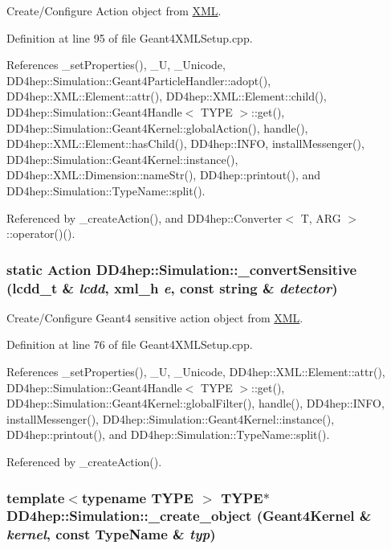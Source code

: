 Create/Configure Action object from \hyperlink{namespace_d_d4hep_1_1_x_m_l}{XML}. 

Definition at line 95 of file Geant4XMLSetup.cpp.

References \_\-setProperties(), \_\-U, \_\-Unicode, DD4hep::Simulation::Geant4ParticleHandler::adopt(), DD4hep::XML::Element::attr(), DD4hep::XML::Element::child(), DD4hep::Simulation::Geant4Handle$<$ TYPE $>$::get(), DD4hep::Simulation::Geant4Kernel::globalAction(), handle(), DD4hep::XML::Element::hasChild(), DD4hep::INFO, installMessenger(), DD4hep::Simulation::Geant4Kernel::instance(), DD4hep::XML::Dimension::nameStr(), DD4hep::printout(), and DD4hep::Simulation::TypeName::split().

Referenced by \_\-createAction(), and DD4hep::Converter$<$ T, ARG $>$::operator()().\hypertarget{namespace_d_d4hep_1_1_simulation_ad1e0a4ddeeaccc10df73eaae26c7706b}{
\subsubsection[{\_\-convertSensitive}]{\setlength{\rightskip}{0pt plus 5cm}static {\bf Action} DD4hep::Simulation::\_\-convertSensitive ({\bf lcdd\_\-t} \& {\em lcdd}, \/  {\bf xml\_\-h} {\em e}, \/  const string \& {\em detector})}}
\label{namespace_d_d4hep_1_1_simulation_ad1e0a4ddeeaccc10df73eaae26c7706b}


Create/Configure Geant4 sensitive action object from \hyperlink{namespace_d_d4hep_1_1_x_m_l}{XML}. 

Definition at line 76 of file Geant4XMLSetup.cpp.

References \_\-setProperties(), \_\-U, \_\-Unicode, DD4hep::XML::Element::attr(), DD4hep::Simulation::Geant4Handle$<$ TYPE $>$::get(), DD4hep::Simulation::Geant4Kernel::globalFilter(), handle(), DD4hep::INFO, installMessenger(), DD4hep::Simulation::Geant4Kernel::instance(), DD4hep::printout(), and DD4hep::Simulation::TypeName::split().

Referenced by \_\-createAction().\hypertarget{namespace_d_d4hep_1_1_simulation_af440512bf20439e1b6defb5c164f8d13}{
\subsubsection[{\_\-create\_\-object}]{\setlength{\rightskip}{0pt plus 5cm}template$<$typename TYPE $>$ TYPE$\ast$ DD4hep::Simulation::\_\-create\_\-object ({\bf Geant4Kernel} \& {\em kernel}, \/  const {\bf TypeName} \& {\em typ})}}
\label{namespace_d_d4hep_1_1_simulation_af440512bf20439e1b6defb5c164f8d13}


